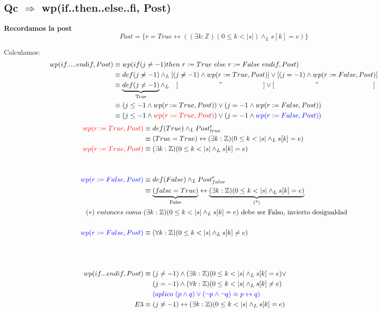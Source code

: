 \documentclass[12pt]{book}
\begin{document}
\subsection{ Qc $\Rightarrow$ wp(if..then..else..fi, Post)}
\textbf{Recordamos la post } 
\[ Post = \{ r = True \leftrightarrow ((\exists k :\mathbb{Z})(0 \leq k < |s|) \wedge_L s[k] = e)\}  \]

Calculamos:
\begin{align*}
 wp(if ..... endif , Post) &\equiv wp(if ( j \neq -1) then \ r := True \ else \ r := False \ endif , Post)  \\
&\equiv def(j\neq -1) \wedge_L  \left[ (j \neq -1) \wedge wp(r := True , Post) \right] \vee \left[ (j = -1) \wedge wp(r := False, Post)\right]  \\
&\equiv \underbrace{def(j\neq -1)}_{\text{True}} \wedge_L \quad [ \qquad \qquad \qquad " \qquad \qquad \qquad ] \vee [\qquad \qquad \qquad " \qquad \qquad \qquad \qquad ]  \\
&\equiv (j \leq -1 \wedge wp(r := True, Post)) \vee (j = -1 \wedge wp(r := False, Post)) \\
&\equiv (j \leq -1 \wedge \textcolor{red}{wp(r := True, Post)}) \vee (j = -1 \wedge \textcolor{blue}{ wp(r := False, Post)}) 
\end{align*}
\begin{align*}
\textcolor{red}{wp(r := True, Post)} &\equiv def (True) \wedge_L Post_{true}^r \\
&\equiv (True = True) \leftrightarrow (\exists k : \mathbb{Z})(0 \leq k < |s| \wedge_L s[k] = e) \\
\textcolor{red}{wp(r := True, Post)} &\equiv (\exists k : \mathbb{Z})(0 \leq k < |s| \wedge_L s[k] = e) \\ \\  \\
\textcolor{blue}{ wp(r := False, Post)} &\equiv def (False) \wedge_L Post_{false}^r \\
&\equiv \underbrace{(false = True)}_{\text{False}} \leftrightarrow \underbrace{(\exists k : \mathbb{Z})(0 \leq k < |s| \wedge_L s[k] = e)}_{\text{(*)}} \\
(*) \ entonces \ como \ & (\exists k : \mathbb{Z})(0 \leq k < |s| \wedge_L s[k] = e)  \text{ debe ser Falso,  invierto desigualdad} \\ \\
\textcolor{blue}{ wp(r := False, Post)} &\equiv (\forall k : \mathbb{Z})(0 \leq k < |s| \wedge_L s[k] \neq e)\\ \\ \\ \\
wp(if... endif , Post) &\equiv (j \neq -1) \wedge ( \exists k : \mathbb{Z})(0 \leq k < |s| \wedge_L
s[k] = e) \vee \\ 
& \quad \ (j = -1) \wedge (\forall k :\mathbb{Z})(0 \leq k < |s| \wedge_L s[k] \neq e) \\
& \quad \ \textcolor{blue}{(aplico \ (p \wedge q) \vee (\neg p \wedge \neg q) \equiv p \leftrightarrow q)} \\
E3 &\equiv (j \neq -1) \leftrightarrow (\exists k :\mathbb{Z})(0 \leq k < |s| \wedge_L s[k] = e) 
\end{align*}
\end{document}

